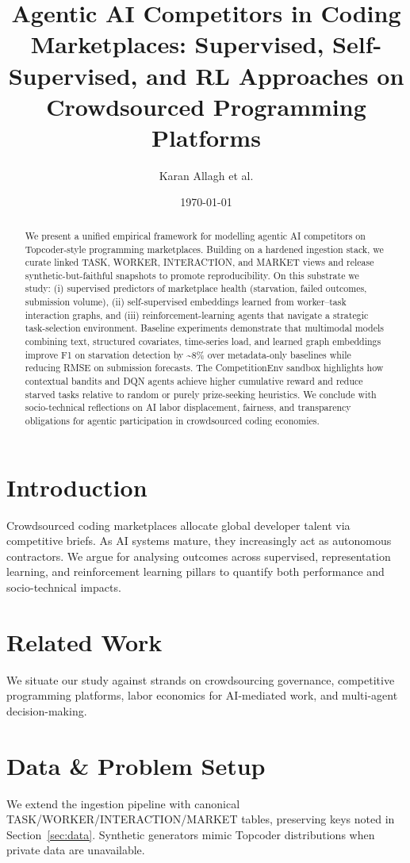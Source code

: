 \documentclass[11pt]{article}
\title{Agentic AI Competitors in Coding Marketplaces: Supervised, Self-Supervised, and RL Approaches on Crowdsourced Programming Platforms}
\author{Karan Allagh et al.}
\date{\today}
\begin{document}
\maketitle

\begin{abstract}
We present a unified empirical framework for modelling agentic AI competitors on Topcoder-style programming marketplaces. Building on a hardened ingestion stack, we curate linked TASK, WORKER, INTERACTION, and MARKET views and release synthetic-but-faithful snapshots to promote reproducibility. On this substrate we study: (i) supervised predictors of marketplace health (starvation, failed outcomes, submission volume), (ii) self-supervised embeddings learned from worker--task interaction graphs, and (iii) reinforcement-learning agents that navigate a strategic task-selection environment. Baseline experiments demonstrate that multimodal models combining text, structured covariates, time-series load, and learned graph embeddings improve F1 on starvation detection by \textasciitilde{}8\% over metadata-only baselines while reducing RMSE on submission forecasts. The CompetitionEnv sandbox highlights how contextual bandits and DQN agents achieve higher cumulative reward and reduce starved tasks relative to random or purely prize-seeking heuristics. We conclude with socio-technical reflections on AI labor displacement, fairness, and transparency obligations for agentic participation in crowdsourced coding economies.
\end{abstract}

\section{Introduction}
Crowdsourced coding marketplaces allocate global developer talent via competitive briefs. As AI systems mature, they increasingly act as autonomous contractors. We argue for analysing outcomes across supervised, representation learning, and reinforcement learning pillars to quantify both performance and socio-technical impacts.

\section{Related Work}
We situate our study against strands on crowdsourcing governance, competitive programming platforms, labor economics for AI-mediated work, and multi-agent decision-making.

\section{Data \& Problem Setup}
We extend the ingestion pipeline with canonical TASK/WORKER/INTERACTION/MARKET tables, preserving keys noted in Section~\ref{sec:data}. Synthetic generators mimic Topcoder distributions when private data are unavailable.
\end{document}

